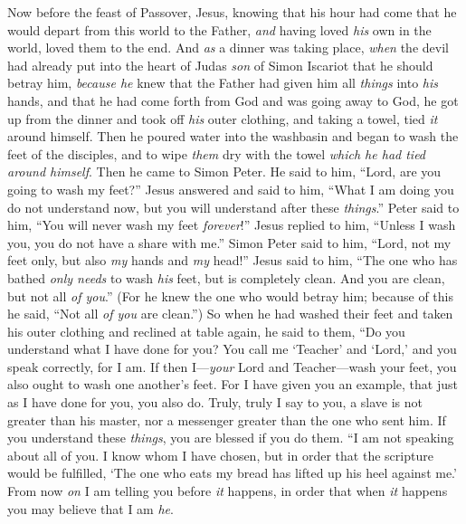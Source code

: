 \begin{biblechapter} %
 Now before the feast of Passover, Jesus, knowing that his hour had come that he would depart from this world to the Father, \textit{and} having loved \textit{his} own in the world, loved them to the end.
\verse And \textit{as} a dinner was taking place, \textit{when} the devil had already put into the heart of Judas \textit{son} of Simon Iscariot that he should betray him,
\verse \textit{because he} knew that the Father had given him all \textit{things} into \textit{his} hands, and that he had come forth from God and was going away to God,
\verse he got up from the dinner and took off \textit{his} outer clothing, and taking a towel, tied \textit{it} around himself.
\verse Then he poured water into the washbasin and began to wash the feet of the disciples, and to wipe \textit{them} dry with the towel \textit{which he had tied around himself}.
\verse Then he came to Simon Peter. He said to him, “Lord, are you going to wash my feet?”
\verse Jesus answered and said to him, “What I am doing you do not understand now, but you will understand after these \textit{things}.”
\verse Peter said to him, “You will never wash my feet \textit{forever}!” Jesus replied to him, “Unless I wash you, you do not have a share with me.”
\verse Simon Peter said to him, “Lord, not my feet only, but also \textit{my} hands and \textit{my} head!”
\verse Jesus said to him, “The one who has bathed \textit{only needs} to wash \textit{his} feet, but is completely clean. And you are clean, but not all \textit{of you}.”
\verse (For he knew the one who would betray him; because of this he said, “Not all \textit{of you} are clean.”)
\verse So when he had washed their feet and taken his outer clothing and reclined at table again, he said to them, “Do you understand what I have done for you?
\verse You call me ‘Teacher’ and ‘Lord,’ and you speak correctly, for I am.
\verse If then I—\textit{your} Lord and Teacher—wash your feet, you also ought to wash one another’s feet.
\verse For I have given you an example, that just as I have done for you, you also do.
\verse Truly, truly I say to you, a slave is not greater than his master, nor a messenger greater than the one who sent him.
\verse If you understand these \textit{things}, you are blessed if you do them.
\verse “I am not speaking about all of you. I know whom I have chosen, but in order that the scripture would be fulfilled, ‘The one who eats my bread has lifted up his heel against me.’
\verse From now \textit{on} I am telling you before \textit{it} happens, in order that when \textit{it} happens you may believe that I am \textit{he}.

\end{biblechapter}
